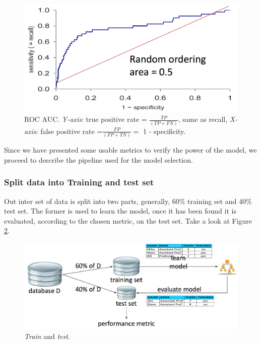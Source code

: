 \begin{figure}[H]%
 \centering
 \includegraphics[width=13cm]{./img/08/roc}
 \caption{\label{pic:roc} ROC AUC. \emph{Y-axis}: true positive rate = $\frac{TP}{(TP + FN)}$, same as recall, \emph{X-axis}: false positive rate =$\frac{FP}{(FP + TN)} =$ 1 - specificity.}
\end{figure}

Since we have presented some usable metrics to verify the power of the model, we proceed to describe the pipeline used for the model selection.

\subsubsection*{Split data into Training and test set}

Out inter set of data is split into two parts, generally, 60\% training set and 40\% test set. The former is used to learn the model, once it has been found it is evaluated, according to the chosen metric, on the test set. Take a look at Figure \ref{pic:train_test}.

\begin{figure}[H]%
 \centering
 \includegraphics[width=13cm]{./img/08/train_test}
 \caption{\label{pic:train_test} \emph{Train} and \emph{test}.}
\end{figure}

